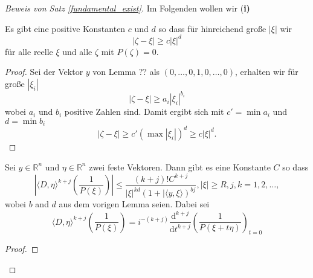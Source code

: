 \begin{proof}[Beweis von Satz \ref{fundamental_exist}]
Im Folgenden wollen wir (\bf{i})

\begin{lem}
Es gibt eine positive Konstanten $c$ und $d$ so dass für hinreichend große $|\xi|$ wir 
\begin{equation}
|\zeta- \xi|\ge c |\xi|^{d}
\end{equation} 
für alle reelle $\xi$ und alle $\zeta$ mit $P(\zeta)=0$.
\end{lem} 
\begin{proof}
Sei der Vektor $y$ von Lemma ?? als $(0,\ldots, 0, 1, 0, \ldots, 0)$, erhalten wir für große $|\xi_i|$
\begin{equation}
|\zeta-\xi|\ge a_i |\xi_i|^{b_i}
\end{equation}
wobei $a_i$ und $b_i$ positive Zahlen sind. Damit ergibt sich mit $c'=\min a_i$ und $d=\min b_i$ 
\begin{equation}
|\zeta - \xi|\ge c'(\max |\xi_i|)^d \ge c |\xi|^d.
\end{equation}
\end{proof}
\begin{lem}
Sei $y\in \mathbb R^n$ und $\eta \in \mathbb R^n$ zwei feste Vektoren. Dann gibt es eine Konstante $C$ so dass
\begin{equation}
\left | \langle D, \eta \rangle^{k+j} \left ( \frac{1}{P(\xi)} \right )  \right | \le \frac{(k+j)! C^{k+j}}{|\xi|^{kd} ( 1+ |\langle y,\xi\rangle )^{bj}}, |\xi|\ge R, j, k=1,2,\ldots,
\end{equation}
wobei $b$ and $d$ aus dem vorigen Lemma seien. Dabei sei
\begin{equation}
\langle D, \eta\rangle^{k+j} \left (\frac{1}{P(\xi)} \right ) = i^{-(k+j)} \frac{\mathrm d^{k+j}}{\mathrm d t^{k+j}} \left ( \frac{1}{P(\xi+ t\eta)} \right )_{t=0}
\end{equation}
\end{lem}
\begin{proof}

\end{proof}
\end{proof}
